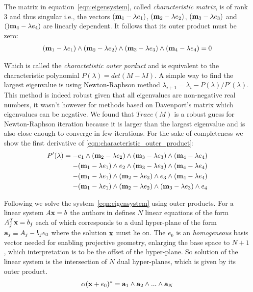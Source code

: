 \documentclass{birkjour}
\numberwithin{equation}{section}
\begin{document}
The matrix in equation~\ref{eqn:eigensystem}, called \emph{characteristic matrix}, is of rank $3$ and thus singular i.e., the vectors $(\textbf m_1 - \lambda e_1)$, $(\textbf m_2 - \lambda e_2)$, $(\textbf m_3 - \lambda e_3)$ and $()\textbf m_4- \lambda e_4)$ are linearly dependent. It follows that its outer product must be zero:
\begin{eqnarray}
\label{eqn:characteristic_outer_product}
(\textbf m_1 - \lambda e_1)\wedge(\textbf m_2 - \lambda e_2)\wedge(\textbf m_3 - \lambda e_3)\wedge(\textbf m_4- \lambda e_4) = 0
\end{eqnarray}

Which is called the \emph{charactetistic outer porduct} and is equivalent to the characteristic polynomial $P(\lambda) = det(M - \lambda I)$. A simple way to find the largest eigenvalue is using Newton-Raphson method $\lambda_{i+1} = \lambda_i - P(\lambda) / P'(\lambda)$. This method is indeed robust given that all eigenvalues are non-negative real numbers, it wasn't however for methods based on Davenport's matrix \cite{Davenport1968} which eigenvalues can be negative. We found that $Trace(M)$ is a robust guess for Newton-Raphson iteration because it is larger than the largest eigenvalue and is also close enough to converge in few iterations. For the sake of completeness we show the first derivative of \ref{eqn:characteristic_outer_product}:
\begin{eqnarray*}
P'(\lambda) = 
- e_1\wedge(\textbf m_2 - \lambda e_2)\wedge(\textbf m_3 - \lambda e_3)\wedge(\textbf m_4- \lambda e_4)\\
- (\textbf m_1 - \lambda e_1)\wedge e_2\wedge(\textbf m_3 - \lambda e_3)\wedge(\textbf m_4- \lambda e_4)\\
- (\textbf m_1 - \lambda e_1)\wedge(\textbf m_2 - \lambda e_2)\wedge e_3\wedge(\textbf m_4- \lambda e_4)\\
- (\textbf m_1 - \lambda e_1)\wedge(\textbf m_2 - \lambda e_2)\wedge(\textbf m_3 - \lambda e_3)\wedge e_4
\end{eqnarray*}

Following \cite{DeKeninck2019} we solve the system~\ref{eqn:eigensystem} using outer products. For a linear system $A \textbf x = b$ the authors in \cite{DeKeninck2019} defines $N$ linear equations of the form $A^T_j \textbf x = b_j$ each of which corresponds to a dual hyper-plane of the form $\textbf a_j \equiv A_j - b_j e_0$ where the solution $\textbf x$ must lie on. The $e_0$ is an \emph{homogeneous} basis vector needed for enabling projective geometry, enlarging the base space to $N+1$, which interpretation is to be the offset of the hyper-plane. So solution of the linear system is the intersection of $N$ dual hyper-planes, which is given by its outer product.
\begin{eqnarray}
\alpha (\textbf x + e_0)^* = \textbf a_1 \wedge \textbf a_2 \wedge ... \wedge \textbf a_N
\end{eqnarray}
\end{document}
